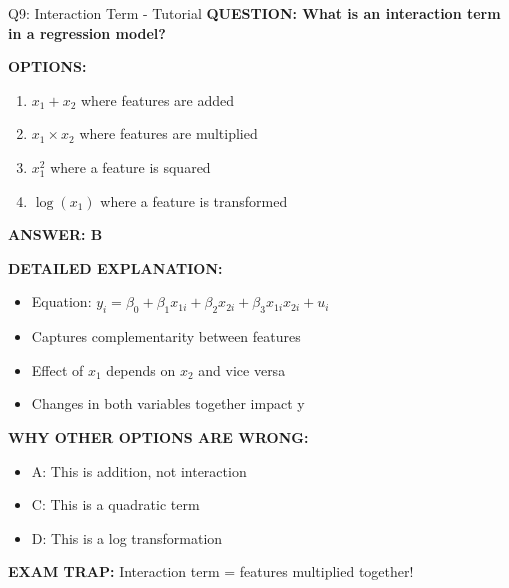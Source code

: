\documentclass[8pt]{beamer}
\begin{document}
	\begin{frame}{Q9: Interaction Term - Tutorial}
		\fontsize{6.5}{7.5}\selectfont
		\textbf{QUESTION: What is an interaction term in a regression model?}
		
		\vspace{0.1cm}
		\textbf{OPTIONS:}
		\begin{enumerate}
			\item $x_1 + x_2$ where features are added
			\item $x_1 \times x_2$ where features are multiplied
			\item $x_1^2$ where a feature is squared
			\item $\log(x_1)$ where a feature is transformed
		\end{enumerate}
		
		\vspace{0.1cm}
		\textcolor{myblue}{\textbf{ANSWER: B}}
		
		\vspace{0.1cm}
		\textbf{DETAILED EXPLANATION:}
		\begin{itemize}
			\item Equation: $y_i = \beta_0 + \beta_1 x_{1i} + \beta_2 x_{2i} + \beta_3 x_{1i} x_{2i} + u_i$
			\item Captures complementarity between features
			\item Effect of $x_1$ depends on $x_2$ and vice versa
			\item Changes in both variables together impact y
		\end{itemize}
		
		\vspace{0.1cm}
		\textcolor{myred}{\textbf{WHY OTHER OPTIONS ARE WRONG:}}
		\begin{itemize}
			\item \textcolor{myred}{A:} This is addition, not interaction
			\item \textcolor{myred}{C:} This is a quadratic term
			\item \textcolor{myred}{D:} This is a log transformation
		\end{itemize}
		
		\textcolor{myred}{\textbf{EXAM TRAP:}} Interaction term = \textcolor{myblue}{features multiplied together}!
	\end{frame}
	
\end{document}
